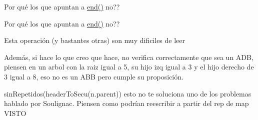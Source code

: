 \begin{DoxyRefList}
Por qué los que apuntan a \hyperlink{classaed2_1_1map_a76023e6a56cb625513e1b5ea028bf983_a76023e6a56cb625513e1b5ea028bf983}{end()} no??

Por qué los que apuntan a \hyperlink{classaed2_1_1map_a76023e6a56cb625513e1b5ea028bf983_a76023e6a56cb625513e1b5ea028bf983}{end()} no?? 
\item[\label{deprecated__deprecated000001}%
\hypertarget{deprecated__deprecated000001}{}%
Página \hyperlink{axiomas}{Axiomas y proposiciones auxiliares} ]Esta operación (y bastantes otras) son muy dificiles de leer 

Además, si hace lo que creo que hace, no verifica correctamente que sea un A\+DB, piensen en un arbol con la raiz igual a 5, su hijo izq igual a 3 y el hijo derecho de 3 igual a 8, eso no es un A\+BB pero cumple su proposición.

sin\+Repetidos(header\+To\+Secu(n.\+parent)) esto no te soluciona uno de los problemas hablado por Soulignac. Piensen como podrían reescribir a partir del rep de map V\+I\+S\+TO
\end{DoxyRefList}